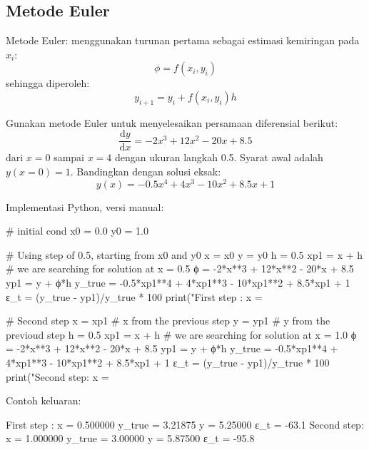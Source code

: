 \subsection{Metode Euler}

Metode Euler: menggunakan turunan pertama sebagai estimasi kemiringan pada
$x_i$:
\begin{equation*}
\phi = f(x_i, y_i)
\end{equation*}
sehingga diperoleh:
\begin{equation}
y_{i+1} = y_{i} + f(x_i, y_i) h
\label{eq:euler_1step}
\end{equation}


\begin{soal}
Gunakan metode Euler untuk menyelesaikan persamaan diferensial berikut:
\begin{equation*}
\frac{\mathrm{d}y}{\mathrm{d}x} = -2x^3 + 12x^2 - 20x + 8.5
\end{equation*}
dari $x=0$ sampai $x=4$ dengan ukuran langkah 0.5.
Syarat awal adalah $y(x=0) = 1$.
Bandingkan dengan solusi eksak:
\begin{equation*}
y(x) = -0.5x^4 + 4x^3 - 10x^2 + 8.5x + 1
\end{equation*}
\end{soal}

Implementasi Python, versi manual:
\begin{pythoncode}
# initial cond
x0 = 0.0
y0 = 1.0

# Using step of 0.5, starting from x0 and y0
x = x0
y = y0
h = 0.5
xp1 = x + h # we are searching for solution at x = 0.5
ϕ = -2*x**3 + 12*x**2 - 20*x + 8.5
yp1 = y + ϕ*h
y_true = -0.5*xp1**4 + 4*xp1**3 - 10*xp1**2 + 8.5*xp1 + 1
ε_t = (y_true - yp1)/y_true * 100
print("First step : x = %

# Second step
x = xp1 # x from the previous step
y = yp1 # y from the previoud step
h = 0.5
xp1 = x + h # we are searching for solution at x = 1.0
ϕ = -2*x**3 + 12*x**2 - 20*x + 8.5
yp1 = y + ϕ*h
y_true = -0.5*xp1**4 + 4*xp1**3 - 10*xp1**2 + 8.5*xp1 + 1
ε_t = (y_true - yp1)/y_true * 100
print("Second step: x = %
\end{pythoncode}

Contoh keluaran:
\begin{textcode}
First step : x = 0.500000 y_true = 3.21875 y = 5.25000 ε_t = -63.1 %
Second step: x = 1.000000 y_true = 3.00000 y = 5.87500 ε_t = -95.8 %
\end{textcode}


